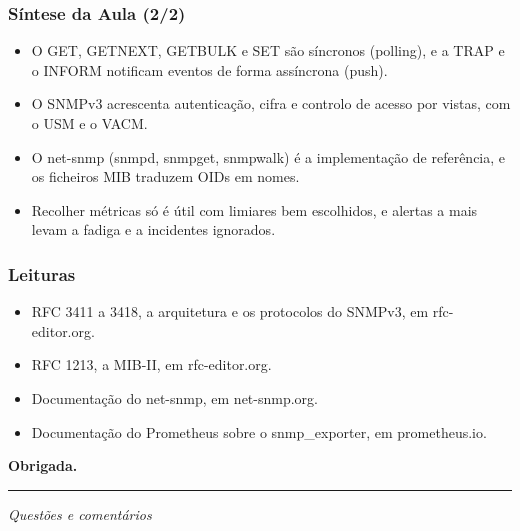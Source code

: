 \documentclass[aspectratio=169]{beamer}
\begin{document}
\begin{frame}
\frametitle{Síntese da Aula \textcolor{NudeTaupe}{\small(2/2)}}
\begin{itemize}
    \setlength\itemsep{0.35cm}
    \item O GET, GETNEXT, GETBULK e SET são síncronos (polling), e a TRAP e o INFORM notificam eventos de forma assíncrona (push).
    \item O SNMPv3 acrescenta autenticação, cifra e controlo de acesso por vistas, com o USM e o VACM.
    \item O net-snmp (snmpd, snmpget, snmpwalk) é a implementação de referência, e os ficheiros MIB traduzem OIDs em nomes.
    \item Recolher métricas só é útil com limiares bem escolhidos, e alertas a mais levam a fadiga e a incidentes ignorados.
\end{itemize}
\end{frame}

\begin{frame}
\frametitle{Leituras}
\begin{itemize}
    \setlength\itemsep{0.4cm}
    \item RFC 3411 a 3418, a arquitetura e os protocolos do SNMPv3, em rfc-editor.org.
    \item RFC 1213, a MIB-II, em rfc-editor.org.
    \item Documentação do net-snmp, em net-snmp.org.
    \item Documentação do Prometheus sobre o snmp\_exporter, em prometheus.io.
\end{itemize}
\end{frame}

\begin{frame}[plain]
  \vspace*{3cm}
  \begin{center}
    \Huge\bfseries\textcolor{TextEspresso}{Obrigada.}\par
    \vspace{0.5cm}
    {\color{NudeTaupe}\rule{2cm}{0.5pt}}\par
    \vspace{0.5cm}
    \Large\textcolor{TextEspresso}{\itshape Questões e comentários}
  \end{center}
\end{frame}
\end{document}
